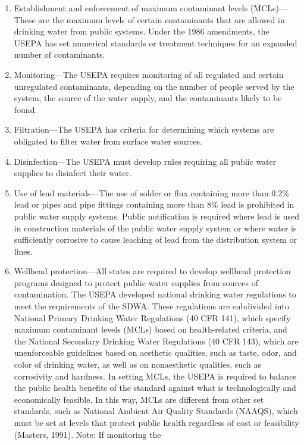 \documentclass{article}
\begin{document}
\begin{enumerate}
\item
  Establishment and enforcement of maximum contaminant levels (MCLs)---
  These are the maximum levels of certain contaminants that are allowed
  in drinking water from public systems. Under the 1986 amendments, the
  USEPA has set numerical standards or treatment techniques for an
  expanded number of contaminants.
\item
  Monitoring---The USEPA requires monitoring of all regulated and
  certain unregulated contaminants, depending on the number of people
  served by the system, the source of the water supply, and the
  contaminants likely to be found.
\item
  Filtration---The USEPA has criteria for determining which systems are
  obligated to filter water from surface water sources.
\item
  Disinfection---The USEPA must develop rules requiring all public water
  supplies to disinfect their water.
\item
  Use of lead materials---The use of solder or flux containing more than
  0.2\% lead or pipes and pipe fittings containing more than 8\% lead is
  prohibited in public water supply systems. Public notification is
  required where lead is used in construction materials of the public
  water supply system or where water is sufficiently corrosive to cause
  leaching of lead from the distribution system or lines.
\item
  Wellhead protection---All states are required to develop wellhead
  protection programs designed to protect public water supplies from
  sources of contamination. The USEPA developed national drinking water
  regulations to meet the requirements of the SDWA. These regulations
  are subdivided into National Primary Drinking Water Regulations (40
  CFR 141), which specify maximum contaminant levels (MCLs) based on
  health-related criteria, and the National Secondary Drinking Water
  Regulations (40 CFR 143), which are unenforceable guidelines based on
  aesthetic qualities, such as taste, odor, and color of drinking water,
  as well as on nonaesthetic qualities, such as corrosivity and
  hardness. In setting MCLs, the USEPA is required to balance the public
  health benefits of the standard against what is technologically and
  economically feasible. In this way, MCLs are different from other set
  standards, such as National Ambient Air Quality Standards (NAAQS),
  which must be set at levels that protect public health regardless of
  cost or feasibility (Masters, 1991). Note: If monitoring the

\end{enumerate}
\end{document}
